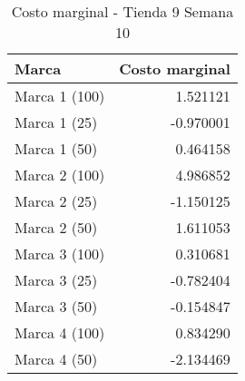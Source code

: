 \begin{table}
\centering
\caption{Costo marginal - Tienda 9 Semana 10}
\begin{tabular}{lr}
\toprule
         Marca &  Costo marginal \\
\midrule
 Marca 1 (100) &        1.521121 \\
  Marca 1 (25) &       -0.970001 \\
  Marca 1 (50) &        0.464158 \\
 Marca 2 (100) &        4.986852 \\
  Marca 2 (25) &       -1.150125 \\
  Marca 2 (50) &        1.611053 \\
 Marca 3 (100) &        0.310681 \\
  Marca 3 (25) &       -0.782404 \\
  Marca 3 (50) &       -0.154847 \\
 Marca 4 (100) &        0.834290 \\
  Marca 4 (50) &       -2.134469 \\
\bottomrule
\end{tabular}
\end{table}
